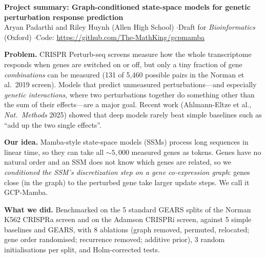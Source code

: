\documentclass[10pt]{article}
\begin{document}
{\large\textbf{Project summary: Graph-conditioned state-space models for genetic perturbation
response prediction}}\\[2pt]
Aryan Padarthi and Riley Huynh (Allen High School) \quad$\cdot$\quad Draft for \emph{Bioinformatics}
(Oxford) \quad$\cdot$\quad Code: \url{https://github.com/The-MathKing/gcpmamba}

\textbf{Problem.} CRISPR Perturb-seq screens measure how the whole transcriptome responds when genes are
switched on or off, but only a tiny fraction of gene \emph{combinations} can be measured (131 of 5,460
possible pairs in the Norman et al.\ 2019 screen). Models that predict unmeasured perturbations---and
especially \emph{genetic interactions}, where two perturbations together do something other than the sum
of their effects---are a major goal. Recent work (Ahlmann-Eltze et al., \emph{Nat.\ Methods} 2025) showed
that deep models rarely beat simple baselines such as ``add up the two single effects''.

\textbf{Our idea.} Mamba-style state-space models (SSMs) process long sequences in linear time, so they
can take all ${\sim}5{,}000$ measured genes as tokens. Genes have no natural order and an SSM does not know
which genes are related, so we \emph{conditioned the SSM's discretization step on a gene co-expression
graph}: genes close (in the graph) to the perturbed gene take larger update steps. We call it GCP-Mamba.

\textbf{What we did.} Benchmarked on the 5 standard GEARS splits of the Norman K562 CRISPRa screen and on
the Adamson CRISPRi screen, against 5 simple baselines and GEARS, with 8 ablations (graph removed,
permuted, relocated; gene order randomised; recurrence removed; additive prior), 3 random initialisations
per split, and Holm-corrected tests.
\end{document}
